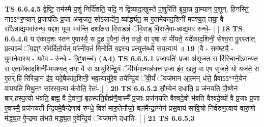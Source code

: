 \documentclass[17pt]{extarticle}
\begin{document}
                  \newline
                                \textbf{ TS 6.6.4.5} \newline
                  द्वेष्टि॒ तम॑स्मै प॒शुं निर्दि॑शति॒ यदि॒ न द्वि॒ष्यादा॒खुस्ते॑ प॒शुरिति॑ ब्रूया॒न्न ग्रा॒म्यान् प॒शून्. हि॒नस्ति॒ नाऽऽ*र॒ण्यान् प्र॒जाप॑तिः प्र॒जा अ॑सृजत॒ सो᳚ऽन्नाद्ये॑न॒ व्या᳚र्द्ध्यत॒ स ए॒तामे॑काद॒शिनी॑-मपश्य॒त् तया॒ वै सो᳚ऽन्नाद्य॒मवा॑रुन्ध॒ यद्दश॒ यूपा॒ भव॑न्ति॒ दशा᳚क्षरा वि॒राडन्नं॑ ॅवि॒राड् वि॒राजै॒वा-न्नाद्य॒मव॑ रुन्धे॒- [  ] \textbf{  18} \newline
                  \newline
                                \textbf{ TS 6.6.4.6} \newline
                  य ए॑काद॒शः स्तन॑ ए॒वास्यै॒ स दु॒ह ए॒वैनां॒ तेन॒ वज्रो॒ वा ए॒षा सं मी॑यते॒ यदे॑काद॒शिनी॒ सेश्व॒रा पु॒रस्ता᳚त् प्र॒त्यञ्चं॑ ॅय॒ज्ञ्ꣳ संम॑र्दितो॒र्यत् पा᳚त्नीव॒तं मि॒नोति॑ य॒ज्ञ्स्य॒ प्रत्युत्त॑ब्ध्यै सय॒त्वाय॑ ॥ \textbf{  19 } \newline
                  \newline
                      (वै - सम॑ष्ट्यै॒ - पुमा॑ने॒वास्य॒ - यमे॒व - रु॑न्धे - त्रिꣳ॒॒शच्च॑)  \textbf{(A4)} \newline \newline
                                        \textbf{ TS 6.6.5.1} \newline
                  प्र॒जापतिः॑ प्र॒जा अ॑सृजत॒ स रि॑रिचा॒नो॑ऽमन्यत॒ स ए॒तामे॑काद॒शिनी॑-मपश्य॒त् तया॒ वै स आयु॑रिन्द्रि॒यं ॅवी॒र्य॑मा॒त्मन्न॑धत्त प्र॒जा इ॑व॒ खलु॒ वा ए॒ष सृ॑जते॒ यो यज॑ते॒ स ए॒तर्.हि॑ रिरिचा॒न इ॑व॒ यदे॒षैका॑द॒शिनी॒ भव॒त्यायु॑रे॒व तये᳚न्द्रि॒यं ॅवी॒र्यं॑ ॅयज॑मान आ॒त्मन् ध॑त्ते॒ प्रैवाऽऽ*ग्ने॒येन॑ वापयति मिथु॒नꣳ सा॑रस्व॒त्या क॑रोति॒ रेतः॑- [  ] \textbf{  20} \newline
                  \newline
                                \textbf{ TS 6.6.5.2} \newline
                  सौ॒म्येन॑ दधाति॒ प्र ज॑नयति पौ॒ष्णेन॑ बार्.हस्प॒त्यो भ॑वति॒ ब्रह्म॒ वै दे॒वानां॒ बृह॒स्पति॒र्ब्रह्म॑णै॒वास्मै᳚ प्र॒जाः प्रज॑नयति वैश्वदे॒वो भ॑वति वैश्वदे॒व्यो॑ वै प्र॒जाः प्र॒जा ए॒वास्मै॒ प्रज॑नयती-न्द्रि॒यमे॒वैन्द्रेणाव॑ रुन्धे॒ विशं॑ मारु॒तेनौजो॒ बल॑मैन्द्रा॒ग्नेन॑ प्रस॒वाय॑ सावि॒त्रो नि॑र्वरुण॒त्वाय॑ वारु॒णो म॑द्ध्य॒त ऐ॒न्द्रमा ल॑भते मद्ध्य॒त ए॒वेन्द्रि॒यं ॅयज॑माने दधाति- [  ] \textbf{  21} \newline
                  \newline
                                \textbf{ TS 6.6.5.3} \newline
\end{document}
